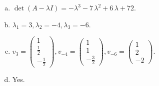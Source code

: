 \begin{questions}
\begin{solution}
\begin{enumerate}[(a)]
\item $\det(A-\lambda I)=-{\lambda}^{3} - 7 \, {\lambda}^{2} + 6 \, {\lambda} + 72$.
\item ${\lambda}_1=3, {\lambda}_2=-4, {\lambda}_3=-6$.
\item $v_{3}=\left(\begin{array}{r}
1 \\
\frac{1}{2} \\
-\frac{1}{2}
\end{array}\right), v_{-4}=\left(\begin{array}{r}
1 \\
1 \\
-\frac{3}{2}
\end{array}\right), v_{-6}=\left(\begin{array}{r}
1 \\
2 \\
-2
\end{array}\right)$.
\item Yes.
\end{enumerate}
\end{solution}

\end{questions}

\newpage


\begin{center}
\end{center}

